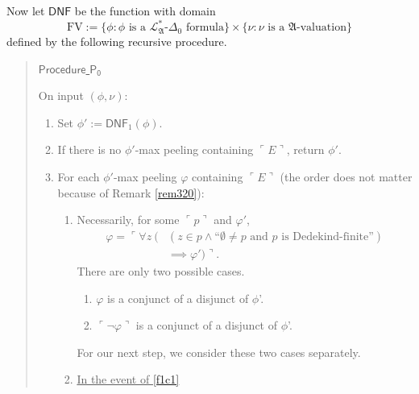 \documentclass[12pt]{article}
\numberwithin{equation}{section}
\begin{document}
Now let $\mathsf{DNF}$ be the function with domain
\begin{equation*}
    \mathrm{FV} := \{\phi: \phi \text{ is a } \mathcal{L}^{*}_{\mathfrak{A}}\text{-}\Delta_0 \text{ formula}\} \times \{\nu : \nu \text{ is a } \mathfrak{A}\text{-valuation}\} 
\end{equation*} 
defined by the following recursive procedure.
\begin{quote}
    \underline{$\mathsf{Procedure}$ $\mathsf{P_0}$}

    On input $(\phi, \nu)$:
    \begin{enumerate}[label=(\arabic*)]
        \item Set $\phi' := \mathsf{DNF}_1(\phi)$.
        \item If there is no $\phi'$-max peeling containing $\ulcorner E \urcorner$, return $\phi'$.
        \item For each $\phi'$-max peeling $\varphi$ containing $\ulcorner E \urcorner$ (the order does not matter because of Remark \ref{rem320}):
        \begin{enumerate}[label=(F\arabic*), leftmargin=30pt]
            \item Necessarily, for some $\ulcorner p \urcorner$ and $\varphi'$,
                \begin{align*}
                    \varphi = \ulcorner \forall z \ ( & (z \in p \wedge \text{``}\emptyset \neq p \text{ and } p \text{ is Dedekind-finite''}) \\
                    & \implies \varphi') \urcorner \text{.}
                \end{align*}
                There are only two possible cases.
                \begin{enumerate}[label=Case \arabic*:, leftmargin=50pt]
                    \item\label{f1c1} $\varphi$ is a conjunct of a disjunct of $\phi$'.
                    \item\label{f1c2} $\ulcorner \neg \varphi \urcorner$ is a conjunct of a disjunct of $\phi$'.
                \end{enumerate}
                For our next step, we consider these two cases separately.
            
            \item\label{step3} \underline{In the event of \ref{f1c1}}
            

\end{enumerate}
\end{enumerate}
\end{quote}
\end{document}
